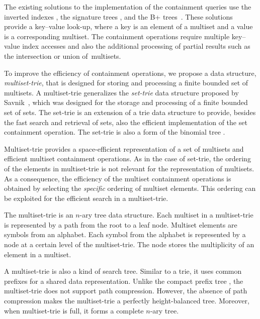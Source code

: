 \documentclass[algorithms,article,accept,pdftex,moreauthors]{Definitions/mdpi}
\begin{document}
The existing solutions to the implementation of the containment queries use the inverted indexes \cite{zobel1992efficient,zobel1998inverted,zobel2006inverted,broder2006indexing,terrovitis2006cikm,terrovitis2011icdt}, the signature trees \cite{deppisch1986sigir,tousidou2002sigstruc,yangjun2005stree,zobel1998inverted}, and the B+ trees~\cite{Helmer2003,terrovitis2011icdt}. These solutions provide a key--value look-up, where a key is an element of a multiset and a value is a corresponding multiset. The containment operations require multiple key--value index accesses and also the additional processing of partial results such as the intersection or union of~multisets.

To improve the efficiency of containment operations, we propose a data structure, \emph{multiset-trie}, that is designed for storing and processing a finite bounded set of multisets. A multiset-trie generalizes the \emph{set-trie} data structure proposed by Savnik~\cite{savnik2013index,savnik2021plos}, which was designed for the storage and processing of a finite bounded set of sets. 
The set-trie is an extension of a trie data structure to provide, besides the fast search and retrieval of sets, also the efficient implementation of the set containment operation. The set-trie is also a form of the binomial tree \cite{corman2001}.

Multiset-trie provides a space-efficient representation of a set of multisets and efficient multiset containment operations. As in the case of set-trie, the ordering of the elements in multiset-trie is not relevant for the representation of multisets. As a consequence, the efficiency of the multiset containment operations is obtained by selecting the \emph{specific} ordering of multiset elements. This ordering can be exploited for the efficient search in a multiset-trie.  

The multiset-trie is an $n$-ary tree data structure. Each multiset in a multiset-trie is represented by a path from the root to a leaf node. Multiset elements are symbols from an alphabet. Each symbol from the alphabet is represented by a node at a certain level of the multiset-trie. The node stores the multiplicity of an element in a multiset.

A multiset-trie is also a kind of search tree. Similar to a trie, it uses common prefixes for a shared data representation. Unlike the compact prefix tree \cite{Sedgewick:2011:ALG:2011916}, the multiset-trie does not support path compression. However, the absence of path compression makes the multiset-trie a perfectly height-balanced tree. Moreover, when multiset-trie is full, it forms a complete $n$-ary tree.
\end{document}
